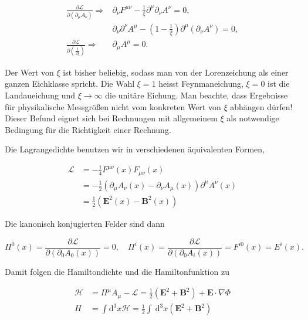 \documentclass[10pt, letterpaper]{article}
\begin{document}
$$
\begin{aligned}
\frac{\partial \mathscr{L}}{\partial\left(\partial_{\mu} A_{\nu}\right)} \Rightarrow & \partial_{\nu} F^{\mu \nu}-\frac{1}{\xi} \partial^{\mu} \partial_{\nu} A^{\nu}=0, \\
& \partial_{\nu} \partial^{\nu} A^{\mu}-\left(1-\frac{1}{\xi}\right) \partial^{\mu}\left(\partial_{\nu} A^{\nu}\right)=0, \\
\frac{\partial \mathscr{L}}{\partial\left(\frac{1}{2 \xi}\right)} \Rightarrow & \partial_{\mu} A^{\mu}=0 .
\end{aligned}
$$

Der Wert von $\xi$ ist bisher beliebig, sodass man von der Lorenzeichung als einer ganzen Eichklasse spricht. Die Wahl $\xi=1$ heisst Feynmaneichung, $\xi=0$ ist die Landaueichung und $\xi \rightarrow \infty$ die unitäre Eichung. Man beachte, dass Ergebnisse für physikalische Messgrößen nicht vom konkreten Wert von $\xi$ abhängen dürfen! Dieser Befund eignet sich bei Rechnungen mit allgemeinem $\xi$ als notwendige Bedingung für die Richtigkeit einer Rechnung.

Die Lagrangedichte benutzen wir in verschiedenen äquivalenten Formen,

$$
\begin{aligned}
\mathscr{L} & =-\frac{1}{4} F^{\mu \nu}(x) F_{\mu \nu}(x) \\
& =-\frac{1}{2}\left(\partial_{\mu} A_{\nu}(x)-\partial_{\nu} A_{\mu}(x)\right) \partial^{\mu} A^{\nu}(x) \\
& =\frac{1}{2}\left(\mathbf{E}^{2}(x)-\mathbf{B}^{2}(x)\right)
\end{aligned}
$$

Die kanonisch konjugierten Felder sind dann

$$
\Pi^{0}(x)=\frac{\partial \mathscr{L}}{\partial\left(\partial_{0} A_{0}(x)\right)}=0, \quad \Pi^{i}(x)=\frac{\partial \mathscr{L}}{\partial\left(\partial_{0} A_{i}(x)\right)}=F^{i 0}(x)=E^{i}(x) .
$$

Damit folgen die Hamiltondichte und die Hamiltonfunktion zu

$$
\begin{aligned}
\mathscr{H} & =\Pi^{\mu} \dot{A}_{\mu}-\mathscr{L}=\frac{1}{2}\left(\mathbf{E}^{2}+\mathbf{B}^{2}\right)+\mathbf{E} \cdot \nabla \Phi \\
H & =\int \mathrm{d}^{3} x \mathscr{H}=\frac{1}{2} \int \mathrm{~d}^{3} x\left(\mathbf{E}^{2}+\mathbf{B}^{2}\right)
\end{aligned}
$$
\end{document}

